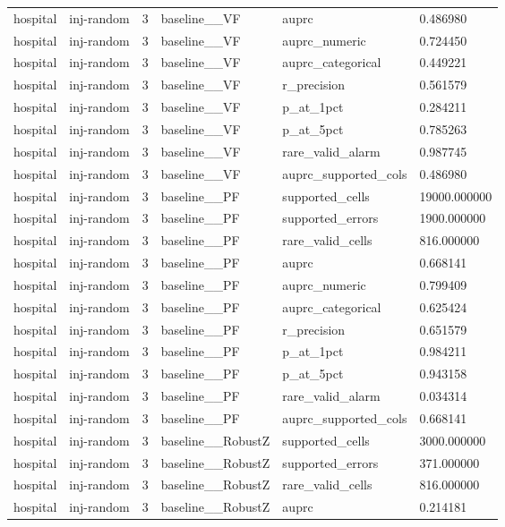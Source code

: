 \begin{tabular}{llllll}
hospital & inj-random & 3 & baseline\_\_VF & auprc & 0.486980 \\
hospital & inj-random & 3 & baseline\_\_VF & auprc\_numeric & 0.724450 \\
hospital & inj-random & 3 & baseline\_\_VF & auprc\_categorical & 0.449221 \\
hospital & inj-random & 3 & baseline\_\_VF & r\_precision & 0.561579 \\
hospital & inj-random & 3 & baseline\_\_VF & p\_at\_1pct & 0.284211 \\
hospital & inj-random & 3 & baseline\_\_VF & p\_at\_5pct & 0.785263 \\
hospital & inj-random & 3 & baseline\_\_VF & rare\_valid\_alarm & 0.987745 \\
hospital & inj-random & 3 & baseline\_\_VF & auprc\_supported\_cols & 0.486980 \\
hospital & inj-random & 3 & baseline\_\_PF & supported\_cells & 19000.000000 \\
hospital & inj-random & 3 & baseline\_\_PF & supported\_errors & 1900.000000 \\
hospital & inj-random & 3 & baseline\_\_PF & rare\_valid\_cells & 816.000000 \\
hospital & inj-random & 3 & baseline\_\_PF & auprc & 0.668141 \\
hospital & inj-random & 3 & baseline\_\_PF & auprc\_numeric & 0.799409 \\
hospital & inj-random & 3 & baseline\_\_PF & auprc\_categorical & 0.625424 \\
hospital & inj-random & 3 & baseline\_\_PF & r\_precision & 0.651579 \\
hospital & inj-random & 3 & baseline\_\_PF & p\_at\_1pct & 0.984211 \\
hospital & inj-random & 3 & baseline\_\_PF & p\_at\_5pct & 0.943158 \\
hospital & inj-random & 3 & baseline\_\_PF & rare\_valid\_alarm & 0.034314 \\
hospital & inj-random & 3 & baseline\_\_PF & auprc\_supported\_cols & 0.668141 \\
hospital & inj-random & 3 & baseline\_\_RobustZ & supported\_cells & 3000.000000 \\
hospital & inj-random & 3 & baseline\_\_RobustZ & supported\_errors & 371.000000 \\
hospital & inj-random & 3 & baseline\_\_RobustZ & rare\_valid\_cells & 816.000000 \\
hospital & inj-random & 3 & baseline\_\_RobustZ & auprc & 0.214181 \\

\end{tabular}
